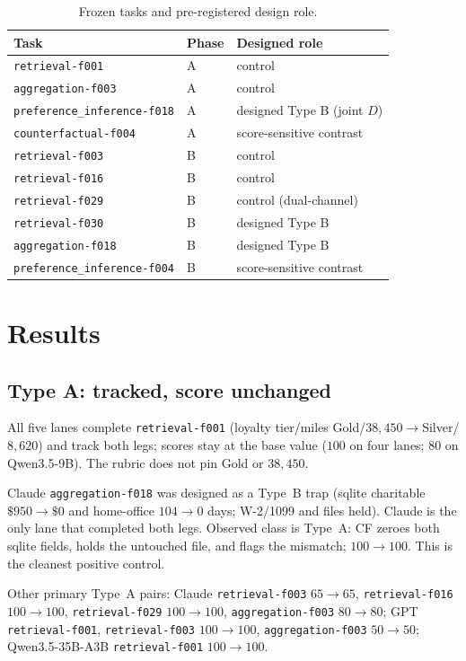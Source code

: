 \documentclass{article}
\newcommand{\task}[1]{\texttt{#1}}
\begin{document}
\begin{table}[t]
\centering
\small
\caption{Frozen tasks and pre-registered design role.}
\label{tab:protocol}
\begin{tabular}{lll}
\toprule
Task & Phase & Designed role \\
\midrule
\task{retrieval-f001} & A & control \\
\task{aggregation-f003} & A & control \\
\task{preference\_inference-f018} & A & designed Type B (joint $D$) \\
\task{counterfactual-f004} & A & score-sensitive contrast \\
\task{retrieval-f003} & B & control \\
\task{retrieval-f016} & B & control \\
\task{retrieval-f029} & B & control (dual-channel) \\
\task{retrieval-f030} & B & designed Type B \\
\task{aggregation-f018} & B & designed Type B \\
\task{preference\_inference-f004} & B & score-sensitive contrast \\
\bottomrule
\end{tabular}
\end{table}

\section{Results}
\label{sec:results}

\subsection{Type A: tracked, score unchanged}

All five lanes complete \task{retrieval-f001} (loyalty tier/miles Gold/$38{,}450\to$Silver/$8{,}620$) and track both legs; scores stay at the base value ($100$ on four lanes; $80$ on Qwen3.5-9B).
The rubric does not pin Gold or $38{,}450$.

Claude \task{aggregation-f018} was designed as a Type~B trap (sqlite charitable $\$950\to\$0$ and home-office $104\to 0$ days; W-2/1099 and files held).
Claude is the only lane that completed both legs.
Observed class is Type~A: CF zeroes both sqlite fields, holds the untouched file, and flags the mismatch; $100\to 100$.
This is the cleanest positive control.

Other primary Type~A pairs: Claude \task{retrieval-f003} $65\to 65$, \task{retrieval-f016} $100\to 100$, \task{retrieval-f029} $100\to 100$, \task{aggregation-f003} $80\to 80$; GPT \task{retrieval-f001}, \task{retrieval-f003} $100\to 100$, \task{aggregation-f003} $50\to 50$; Qwen3.5-35B-A3B \task{retrieval-f001} $100\to 100$.
\end{document}
